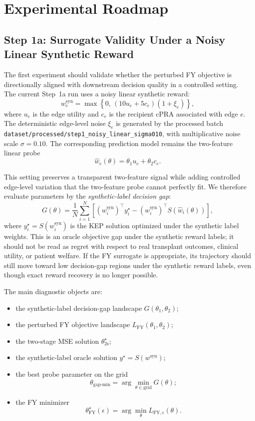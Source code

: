 \documentclass{article}
\begin{document}
\section{Experimental Roadmap}

\subsection{Step 1a: Surrogate Validity Under a Noisy Linear Synthetic Reward}

The first experiment should validate whether the perturbed FY objective is
directionally aligned with downstream decision quality in a controlled setting.
The current Step~1a run uses a noisy linear synthetic reward:
\[
    w^{\mathrm{syn}}_e
    =
    \max\left\{
        0,\,
        (10u_e + 5c_e)(1+\xi_e)
    \right\},
\]
where \(u_e\) is the edge utility and \(c_e\) is the recipient cPRA associated
with edge \(e\). The deterministic edge-level noise \(\xi_e\) is generated by
the processed batch
\texttt{dataset/processed/step1\_noisy\_linear\_sigma010}, with multiplicative
noise scale \(\sigma=0.10\). The corresponding prediction model remains the
two-feature linear probe
\[
    \hat w_e(\theta) = \theta_1 u_e + \theta_2 c_e.
\]

This setting preserves a transparent two-feature signal while adding controlled
edge-level variation that the two-feature probe cannot perfectly fit. We
therefore evaluate parameters by the \emph{synthetic-label decision gap}:
\[
    G(\theta)
    =
    \frac{1}{N}
    \sum_{i=1}^{N}
    \left[
        (w_i^{\mathrm{syn}})^\top y_i^\star
        -
        (w_i^{\mathrm{syn}})^\top S(\hat w_i(\theta))
    \right],
\]
where \(y_i^\star=S(w_i^{\mathrm{syn}})\) is the KEP solution optimized under
the synthetic label weights. This is an oracle objective gap under the synthetic
reward labels; it should not be read as regret with respect to real transplant
outcomes, clinical utility, or patient welfare. If the FY surrogate is
appropriate, its trajectory should still move toward low decision-gap regions
under the synthetic reward labels, even though exact reward recovery is no
longer possible.

The main diagnostic objects are:
\begin{itemize}
    \item the synthetic-label decision-gap landscape \(G(\theta_1,\theta_2)\);
    \item the perturbed FY objective landscape \(L_{\mathrm{FY}}(\theta_1,\theta_2)\);
    \item the two-stage MSE solution \(\theta^\star_{\mathrm{2s}}\);
    \item the synthetic-label oracle solution \(y^\star=S(w^{\mathrm{syn}})\);
    \item the best probe parameter on the grid
    \[
        \theta_{\mathrm{gap\text{-}min}}
        =
        \arg\min_{\theta \in \mathrm{grid}} G(\theta);
    \]
    \item the FY minimizer
    \[
        \theta^\star_{\mathrm{FY}}(\epsilon)
        =
        \arg\min_{\theta} L_{\mathrm{FY},\epsilon}(\theta).
    \]
\end{itemize}
\end{document}
